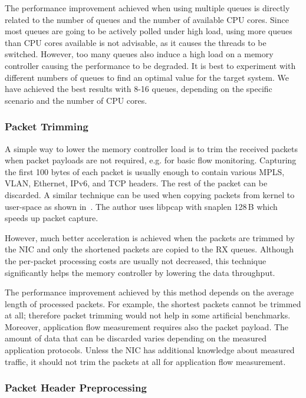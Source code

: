 The performance improvement achieved when using multiple queues is directly related to the number of queues and the number of available CPU cores. Since most queues are going to be actively polled under high load, using more queues than CPU cores available is not advisable, as it causes the threads to be switched. However, too many queues also induce a high load on a memory controller causing the performance to be degraded. It is best to experiment with different numbers of queues to find an optimal value for the target system. We have achieved the best results with 8-16 queues, depending on the specific scenario and the number of CPU cores.

\subsubsection{Packet Trimming}

A simple way to lower the memory controller load is to trim the received packets when packet payloads are not required, e.g. for basic flow monitoring. Capturing the first 100 bytes of each packet is usually enough to contain various MPLS, VLAN, Ethernet, IPv6, and TCP headers. The rest of the packet can be discarded. A similar technique can be used when copying packets from kernel to user-space as shown in~\cite{Deri-2004-Improving}. The author uses libpcap with snaplen 128\,B which speeds up packet capture.

However, much better acceleration is achieved when the packets are trimmed by the NIC and only the shortened packets are copied to the RX queues. Although the per-packet processing costs are usually not decreased, this technique significantly helps the memory controller by lowering the data throughput. 

The performance improvement achieved by this method depends on the average length of processed packets. For example, the shortest packets cannot be trimmed at all; therefore packet trimming would not help in some artificial benchmarks. Moreover, application flow measurement requires also the packet payload. The amount of data that can be discarded varies depending on the measured application protocols. Unless the NIC has additional knowledge about measured traffic, it should not trim the packets at all for application flow measurement.

\subsubsection{Packet Header Preprocessing}

